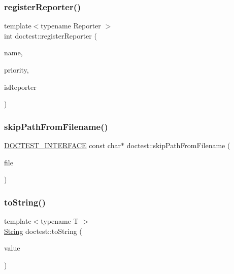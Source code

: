 \mbox{\label{namespacedoctest_a9e878a811f7bf0a615b3a39de3004673}} 
\subsubsection{\texorpdfstring{register\+Reporter()}{registerReporter()}}
{\footnotesize\ttfamily template$<$typename Reporter $>$ \\
int doctest\+::register\+Reporter (\begin{DoxyParamCaption}\item[{const char $\ast$}]{name,  }\item[{int}]{priority,  }\item[{bool}]{is\+Reporter }\end{DoxyParamCaption})}

\mbox{\label{namespacedoctest_adb4ee7dd3659dcc165944d73f6e29199}} 
\subsubsection{\texorpdfstring{skip\+Path\+From\+Filename()}{skipPathFromFilename()}}
{\footnotesize\ttfamily \mbox{\hyperlink{doctest_8h_a9c16ffc635ec47f07797d21ede26b1a5}{D\+O\+C\+T\+E\+S\+T\+\_\+\+I\+N\+T\+E\+R\+F\+A\+CE}} const char$\ast$ doctest\+::skip\+Path\+From\+Filename (\begin{DoxyParamCaption}\item[{const char $\ast$}]{file }\end{DoxyParamCaption})}

\mbox{\label{namespacedoctest_a8907bf35788959391343a2304f004e17}} 
\subsubsection{\texorpdfstring{to\+String()}{toString()}\hspace{0.1cm}{\footnotesize\ttfamily [1/18]}}
{\footnotesize\ttfamily template$<$typename T $>$ \\
\mbox{\hyperlink{classdoctest_1_1_string}{String}} doctest\+::to\+String (\begin{DoxyParamCaption}\item[{const \mbox{\hyperlink{doctest_8h_af2901cafb023c57fb672ccb1bf14f2eb}{D\+O\+C\+T\+E\+S\+T\+\_\+\+R\+E\+F\+\_\+\+W\+R\+AP}}(T)}]{value }\end{DoxyParamCaption})}

